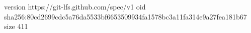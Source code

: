 version https://git-lfs.github.com/spec/v1
oid sha256:80cd2699cdc5a76da5533bf6653509934fa1578bc3a11fa314e9a27fea181b67
size 411
